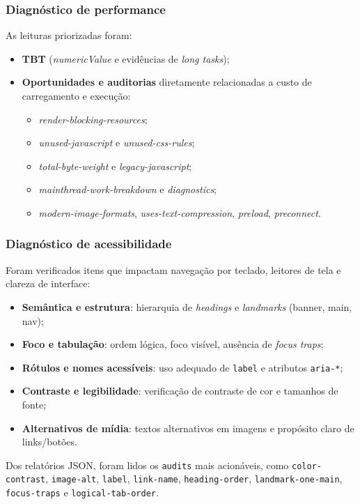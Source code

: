 \subsubsection{Diagnóstico de performance}
As leituras priorizadas foram:
\begin{itemize}
  \item \textbf{TBT} (\textit{numericValue} e evidências de \textit{long tasks});
  \item \textbf{Oportunidades e auditorias} diretamente relacionadas a custo de carregamento e execução:
  \begin{itemize}
    \item \textit{render-blocking-resources};
    \item \textit{unused-javascript} e \textit{unused-css-rules};
    \item \textit{total-byte-weight} e \textit{legacy-javascript};
    \item \textit{mainthread-work-breakdown} e \textit{diagnostics};
    \item \textit{modern-image-formats}, \textit{uses-text-compression}, \textit{preload}, \textit{preconnect}.
  \end{itemize}
\end{itemize}

\subsubsection{Diagnóstico de acessibilidade}
Foram verificados itens que impactam navegação por teclado, leitores de tela e clareza de interface:
\begin{itemize}
  \item \textbf{Semântica e estrutura}: hierarquia de \textit{headings} e \textit{landmarks} (banner, main, nav);
  \item \textbf{Foco e tabulação}: ordem lógica, foco visível, ausência de \textit{focus traps};
  \item \textbf{Rótulos e nomes acessíveis}: uso adequado de \texttt{label} e atributos \texttt{aria-*};
  \item \textbf{Contraste e legibilidade}: verificação de contraste de cor e tamanhos de fonte;
  \item \textbf{Alternativos de mídia}: textos alternativos em imagens e propósito claro de links/botões.
\end{itemize}
Dos relatórios JSON, foram lidos os \texttt{audits} mais acionáveis, como
\texttt{color-contrast}, \texttt{image-alt}, \texttt{label}, \texttt{link-name},
\texttt{heading-order}, \texttt{landmark-one-main}, \texttt{focus-traps} e \texttt{logical-tab-order}.


